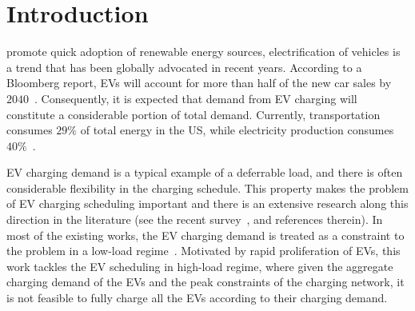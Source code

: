 \documentclass[journal]{IEEEtran}
\newcommand{\rev}[1]{{\color{black}#1}}%
\newcommand{\revv}[1]{{\color{black}#1}}%
\newcommand{\rev}[1]{#1}
\begin{document}
		\section{Introduction}
\label{sec:intro}	
 promote quick adoption of renewable energy sources, electrification of vehicles is a trend that has been globally advocated in recent years. \rev{According to a Bloomberg report, EVs will account for more than half of the new car sales by $2040$~\cite{bloomberg}. 		
	Consequently, it is expected that demand from EV charging will constitute a considerable portion of total demand. 
	Currently, transportation consumes $29\%$ of total energy in the US, while electricity production consumes $40\%$~\cite{Zhao}.} 

\revv{EV charging demand is a typical example of a deferrable load, and there is often considerable flexibility in the charging schedule. This property makes the problem of EV charging scheduling  important and there is an extensive research along this direction in the literature (see the recent survey~\cite{mukherjee2015review}, and references therein). In most of the existing works, the EV charging demand is treated as a constraint to the problem in a low-load regime~\cite{Tang}.  Motivated by rapid proliferation of EVs, this work tackles the EV scheduling in high-load regime, where given the aggregate charging demand of the EVs and the peak constraints of the charging network, it is not feasible to fully charge all the EVs according to their charging demand.}
\end{document}
